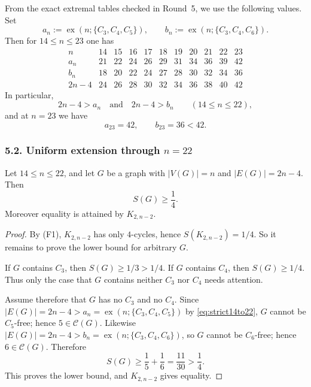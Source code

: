From the exact extremal tables checked in Round~5, we use the following values.
Set
\[
a_n:=\operatorname{ex}(n;\{C_3,C_4,C_5\}),
\qquad
b_n:=\operatorname{ex}(n;\{C_3,C_4,C_6\}).
\]
Then for $14\le n\le 23$ one has
\[
\begin{array}{c|cccccccccc}
 n & 14&15&16&17&18&19&20&21&22&23\\\hline
 a_n & 21&22&24&26&29&31&34&36&39&42\\
 b_n & 18&20&22&24&27&28&30&32&34&36\\
 2n-4 & 24&26&28&30&32&34&36&38&40&42
\end{array}
\]
In particular,
\begin{equation}\label{eq:strict14to22}
2n-4>a_n\quad\text{and}\quad 2n-4>b_n\qquad(14\le n\le 22),
\end{equation}
and at $n=23$ we have
\begin{equation}\label{eq:n23exact}
a_{23}=42,
\qquad
b_{23}=36<42.
\end{equation}

\subsubsection*{5.2. Uniform extension through $n=22$}

\begin{proposition}[The line $m=2n-4$ for $14\le n\le 22$]\label{prop:14-22}
Let $14\le n\le 22$, and let $G$ be a graph with $|V(G)|=n$ and $|E(G)|=2n-4$.
Then
\[
S(G)\ge \frac14.
\]
Moreover equality is attained by $K_{2,n-2}$.
\end{proposition}

\begin{proof}
By (F1), $K_{2,n-2}$ has only $4$-cycles, hence $S(K_{2,n-2})=1/4$.
So it remains to prove the lower bound for arbitrary $G$.

If $G$ contains $C_3$, then $S(G)\ge 1/3>1/4$.
If $G$ contains $C_4$, then $S(G)\ge 1/4$.
Thus only the case that $G$ contains neither $C_3$ nor $C_4$ needs attention.

Assume therefore that $G$ has no $C_3$ and no $C_4$.
Since $|E(G)|=2n-4>a_n=\operatorname{ex}(n;\{C_3,C_4,C_5\})$ by \eqref{eq:strict14to22},
$G$ cannot be $C_5$-free; hence $5\in\mathcal C(G)$.
Likewise $|E(G)|=2n-4>b_n=\operatorname{ex}(n;\{C_3,C_4,C_6\})$, so $G$ cannot be $C_6$-free; hence $6\in\mathcal C(G)$.
Therefore
\[
S(G)\ge \frac15+\frac16=\frac{11}{30}>\frac14.
\]
This proves the lower bound, and $K_{2,n-2}$ gives equality.
\end{proof}

